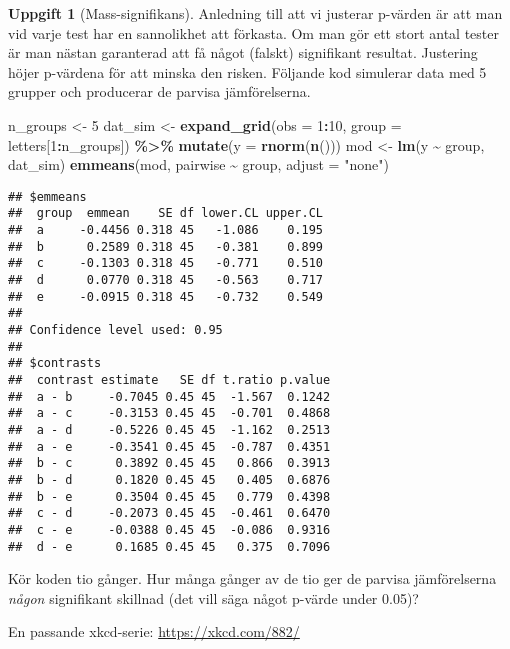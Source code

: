 \documentclass[
]{book}
\newenvironment{Shaded}{\begin{snugshade}}{\end{snugshade}}
\newcommand{\AttributeTok}[1]{\textcolor[rgb]{0.13,0.29,0.53}{#1}}
\newcommand{\DecValTok}[1]{\textcolor[rgb]{0.00,0.00,0.81}{#1}}
\newcommand{\FunctionTok}[1]{\textcolor[rgb]{0.13,0.29,0.53}{\textbf{#1}}}
\newcommand{\NormalTok}[1]{#1}
\newcommand{\OtherTok}[1]{\textcolor[rgb]{0.56,0.35,0.01}{#1}}
\newcommand{\SpecialCharTok}[1]{\textcolor[rgb]{0.81,0.36,0.00}{\textbf{#1}}}
\newcommand{\StringTok}[1]{\textcolor[rgb]{0.31,0.60,0.02}{#1}}
\theoremstyle{definition}
\theoremstyle{definition}
\theoremstyle{definition}
\newtheorem{exercise}{Uppgift}[chapter]
\theoremstyle{definition}
\theoremstyle{remark}
\begin{document}
\begin{exercise}[Mass-signifikans]
Anledning till att vi justerar p-värden är att man vid varje test har en sannolikhet att förkasta. Om man gör ett stort antal tester är man nästan garanterad att få något (falskt) signifikant resultat. Justering höjer p-värdena för att minska den risken. Följande kod simulerar data med 5 grupper och producerar de parvisa jämförelserna.

\begin{Shaded}
\begin{Highlighting}[]
\NormalTok{n\_groups }\OtherTok{\textless{}{-}} \DecValTok{5}
\NormalTok{dat\_sim }\OtherTok{\textless{}{-}} \FunctionTok{expand\_grid}\NormalTok{(}\AttributeTok{obs =} \DecValTok{1}\SpecialCharTok{:}\DecValTok{10}\NormalTok{, }\AttributeTok{group =}\NormalTok{ letters[}\DecValTok{1}\SpecialCharTok{:}\NormalTok{n\_groups]) }\SpecialCharTok{\%\textgreater{}\%} \FunctionTok{mutate}\NormalTok{(}\AttributeTok{y =} \FunctionTok{rnorm}\NormalTok{(}\FunctionTok{n}\NormalTok{()))}
\NormalTok{mod }\OtherTok{\textless{}{-}} \FunctionTok{lm}\NormalTok{(y }\SpecialCharTok{\textasciitilde{}}\NormalTok{ group, dat\_sim)}
\FunctionTok{emmeans}\NormalTok{(mod, pairwise }\SpecialCharTok{\textasciitilde{}}\NormalTok{ group, }\AttributeTok{adjust =} \StringTok{"none"}\NormalTok{)}
\end{Highlighting}
\end{Shaded}

\begin{verbatim}
## $emmeans
##  group  emmean    SE df lower.CL upper.CL
##  a     -0.4456 0.318 45   -1.086    0.195
##  b      0.2589 0.318 45   -0.381    0.899
##  c     -0.1303 0.318 45   -0.771    0.510
##  d      0.0770 0.318 45   -0.563    0.717
##  e     -0.0915 0.318 45   -0.732    0.549
## 
## Confidence level used: 0.95 
## 
## $contrasts
##  contrast estimate   SE df t.ratio p.value
##  a - b     -0.7045 0.45 45  -1.567  0.1242
##  a - c     -0.3153 0.45 45  -0.701  0.4868
##  a - d     -0.5226 0.45 45  -1.162  0.2513
##  a - e     -0.3541 0.45 45  -0.787  0.4351
##  b - c      0.3892 0.45 45   0.866  0.3913
##  b - d      0.1820 0.45 45   0.405  0.6876
##  b - e      0.3504 0.45 45   0.779  0.4398
##  c - d     -0.2073 0.45 45  -0.461  0.6470
##  c - e     -0.0388 0.45 45  -0.086  0.9316
##  d - e      0.1685 0.45 45   0.375  0.7096
\end{verbatim}

Kör koden tio gånger. Hur många gånger av de tio ger de parvisa jämförelserna \emph{någon} signifikant skillnad (det vill säga något p-värde under 0.05)?

En passande xkcd-serie: \url{https://xkcd.com/882/}
\end{exercise}
\end{document}
